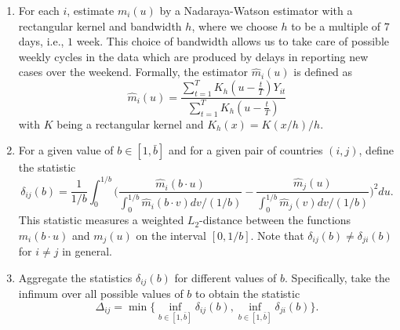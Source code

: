 \documentclass[a4paper,12pt]{article}
\numberwithin{equation}{section}
\begin{document}
\begin{enumerate}[label=\textit{Step \arabic*.},leftmargin=1.45cm]


\item For each $i$, estimate $m_i(u)$ by a Nadaraya-Watson estimator with a rectangular kernel and bandwidth $h$, where we choose $h$ to be a multiple of $7$ days, i.e., $1$ week. This choice of bandwidth allows us to take care of possible weekly cycles in the data which are produced by delays in reporting new cases over the weekend. Formally, the estimator $\hat{m}_i(u)$ is defined as
\[ \hat{m}_i(u) =  \frac{ \sum_{t=1}^T K_h(u - \frac{t}{T}) Y_{it}}{\sum_{t=1}^T K_h(u - \frac{t}{T})} \]
with $K$ being a rectangular kernel and $K_h(x) = K(x/h)/h$. 


\item For a given value of $b \in [1, \bar{b}]$ and for a given pair of countries $(i, j)$, define the statistic
\[ \delta_{ij}(b) = \frac{1}{1/b} \int_0^{1/b} \bigg( \frac{\hat{m}_i (b\cdot u)}{\int_0^{1/b} \hat{m}_i(b\cdot v) dv /(1/b)}  - \frac{\hat{m}_j (u)}{\int_0^{1/b} \hat{m}_j(v) dv /(1/b)}  \bigg)^2 du. \]
This statistic measures a weighted $L_2$-distance between the functions $m_i(b \cdot u)$ and $m_j(u)$ on the interval $[0,1/b]$. Note that $\delta_{ij}(b) \neq \delta_{ji}(b)$ for $i \neq j$ in general.




\item Aggregate the statistics $\delta_{ij}(b)$ for different values of $b$. Specifically, take the infimum over all possible values of $b$ to obtain the statistic
\[ \Delta_{ij} = \min \Big\{ \inf_{b\in [1, \bar{b}]} \delta_{ij}(b), \inf_{b\in [1, \bar{b}]} \delta_{ji}(b) \Big\}. \]



\end{enumerate}
\end{document}
